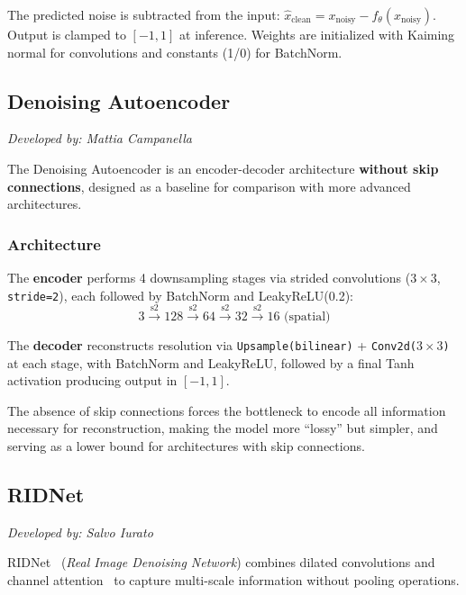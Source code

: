 The predicted noise is subtracted from the input: $\hat{x}_{\text{clean}} = x_{\text{noisy}} - f_\theta(x_{\text{noisy}})$. Output is clamped to $[-1, 1]$ at inference. Weights are initialized with Kaiming normal for convolutions and constants (1/0) for BatchNorm.

\subsection{Denoising Autoencoder}
\label{subsec:denoising-autoencoder}

\textit{Developed by: Mattia Campanella}

\medskip

The Denoising Autoencoder is an encoder-decoder architecture \textbf{without skip connections}, designed as a baseline for comparison with more advanced architectures.

\subsubsection{Architecture}
The \textbf{encoder} performs 4 downsampling stages via strided convolutions ($3\!\times\!3$, \texttt{stride=2}), each followed by BatchNorm and LeakyReLU(0.2):
\begin{equation}
3 \xrightarrow{\text{s2}} 128 \xrightarrow{\text{s2}} 64 \xrightarrow{\text{s2}} 32 \xrightarrow{\text{s2}} 16 \text{ (spatial)} 
\end{equation}

The \textbf{decoder} reconstructs resolution via \texttt{Upsample\allowbreak{}(bilinear)} + \texttt{Conv2d($3\!\times\!3$)} at each stage, with BatchNorm and LeakyReLU, followed by a final Tanh activation producing output in $[-1, 1]$.

The absence of skip connections forces the bottleneck to encode all information necessary for reconstruction, making the model more ``lossy'' but simpler, and serving as a lower bound for architectures with skip connections.

\subsection{RIDNet}
\label{subsec:ridnet}

\textit{Developed by: Salvo Iurato}

\medskip

RIDNet~\cite{ridnet} (\textit{Real Image Denoising Network}) combines dilated convolutions and channel attention~\cite{se} to capture multi-scale information without pooling operations.

